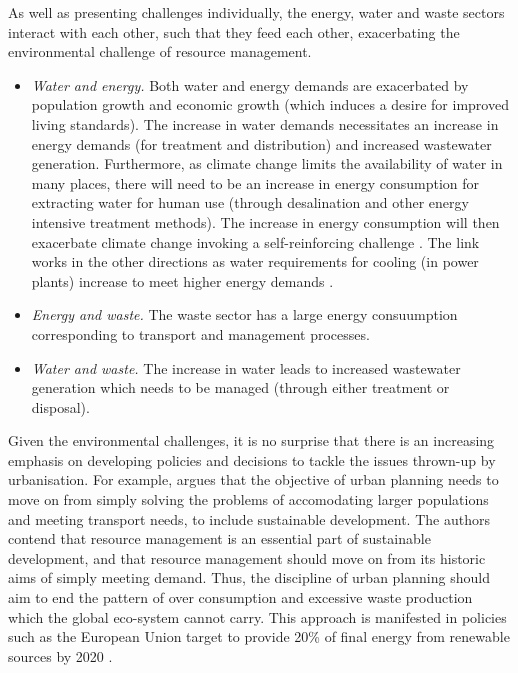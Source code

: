 As well as presenting challenges individually, the energy, water and waste sectors interact with each other, such that they feed each other, exacerbating the environmental challenge of resource management. 
\begin{itemize}
	\item \emph{Water and energy.} Both water and energy demands are exacerbated by population growth and economic growth (which induces a desire for improved living standards). The increase in water demands necessitates an increase in energy demands (for treatment and distribution) and increased wastewater generation. Furthermore, as climate change limits the availability of water in many places, there will need to be an increase in energy consumption for extracting water for human use (through desalination and other energy intensive treatment methods). The increase in energy consumption will then exacerbate climate change invoking a self-reinforcing challenge \citep{Webber2011}. The link works in the other directions as water requirements for cooling (in power plants) increase to meet higher energy demands \citep{McMahon2005}.
	\item \emph{Energy and waste.} The waste sector has a large energy consuumption corresponding to transport and management processes.
	\item \emph{Water and waste.} The increase in water leads to increased wastewater generation which needs to be managed (through either treatment or disposal).
\end{itemize}

Given the environmental challenges, it is no surprise that there is an increasing emphasis on developing policies and decisions to tackle the issues thrown-up by urbanisation. For example, \citet{Agudelo-Vera2011} argues that the objective of urban planning needs to move on from simply solving the problems of accomodating larger populations and meeting transport needs, to include sustainable development. The authors contend that resource management is an essential part of sustainable development, and that resource management should move on from its historic aims of simply meeting demand. Thus, the discipline of urban planning should aim to end the pattern of over consumption and excessive waste production which the global eco-system cannot carry. This approach is manifested in policies such as the European Union target to provide 20\% of final energy from renewable sources by 2020 \citep{Keirstead2012}.

